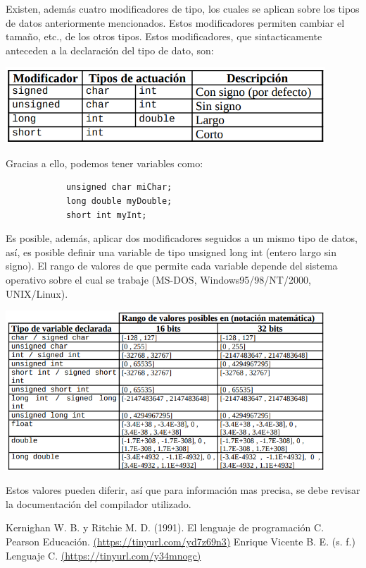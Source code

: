 \documentclass[letterpaper, 12pt]{article}
\begin{document}
        Existen, además cuatro modificadores de tipo, los cuales se aplican sobre los tipos de datos anteriormente
        mencionados. Estos modificadores permiten cambiar el tamaño, etc., de los otros tipos.
        Estos modificadores, que sintacticamente anteceden a la declaración del tipo de dato, son:
            
        \begin{center}
            \includegraphics[width=0.9\textwidth]{src/img/table1.png}
        \end{center}

        Gracias a ello, podemos tener variables como:

        \begin{verbatim}
            unsigned char miChar;
            long double myDouble;
            short int myInt;
        \end{verbatim}

        Es posible, además, aplicar dos modificadores seguidos a un mismo tipo de
        datos, así, es posible definir una variable de tipo unsigned long int (entero largo sin
        signo). El rango de valores de que permite cada variable depende del sistema operativo
        sobre el cual se trabaje (MS-DOS, Windows95/98/NT/2000, UNIX/Linux).

        \begin{center}
            \includegraphics[width=0.9\textwidth]{src/img/table2.png}
        \end{center}

        Estos valores pueden diferir, así que para información mas precisa, se debe revisar la documentación
        del compilador utilizado.

        \newpage

        \begin{thebibliography}{0}
             Kernighan W. B. y Ritchie M. D. (1991). El lenguaje de programación C. Pearson Educación. \href{https://tinyurl.com/yd7z69n3}{(https://tinyurl.com/yd7z69n3)}
             Enrique Vicente B. E. (s. f.) Lenguaje C. \href{https://tinyurl.com/y34mnogc}{(https://tinyurl.com/y34mnogc)}
        \end{thebibliography}
\end{document}
